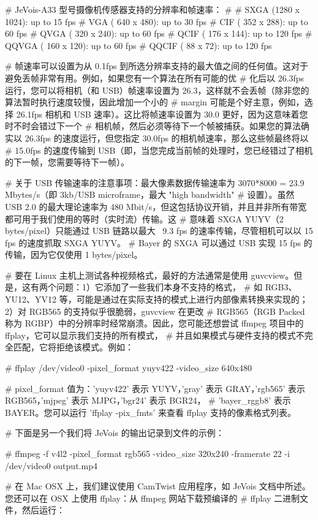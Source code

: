 \begin{DoxyVerb}
# JeVois-A33 型号摄像机传感器支持的分辨率和帧速率：
#
#  SXGA (1280 x 1024): up to 15 fps
#   VGA ( 640 x  480): up to 30 fps
#   CIF ( 352 x  288): up to 60 fps
#  QVGA ( 320 x  240): up to 60 fps
#  QCIF ( 176 x  144): up to 120 fps
# QQVGA ( 160 x  120): up to 60 fps
# QQCIF (  88 x   72): up to 120 fps

# 帧速率可以设置为从 0.1fps 到所选分辨率支持的最大值之间的任何值。这对于避免丢帧非常有用。例如，如果您有一个算法在所有可能的优
# 化后以 26.3fps 运行，您可以将相机（和 USB）帧速率设置为 26.3，这样就不会丢帧（除非您的算法暂时执行速度较慢，因此增加一个小的
# margin 可能是个好主意，例如，选择 26.1fps 相机和 USB 速率）。这比将帧速率设置为 30.0 更好，因为这意味着您时不时会错过下一个
# 相机帧，然后必须等待下一个帧被捕获。如果您的算法确实以 26.3fps 的速度运行，但您指定 30.0fps 的相机帧速率，那么这些帧最终将以 
# 15.0fps 的速度传输到 USB（即，当您完成当前帧的处理时，您已经错过了相机的下一帧，您需要等待下一帧）。

# 关于 USB 传输速率的注意事项：最大像素数据传输速率为 3070*8000 = 23.9 Mbytes/s（即 3kb/USB microframe，最大 "high bandwidth" 
# 设置）。虽然 USB 2.0 的最大理论速率为 480 Mbit/s，但这包括协议开销，并且并非所有带宽都可用于我们使用的等时（实时流）传输。这
# 意味着 SXGA YUYV（2 bytes/pixel）只能通过 USB 链路以最大 ~9.3 fps 的速率传输，尽管相机可以以 15 fps 的速度抓取 SXGA YUYV。
# Bayer 的 SXGA 可以通过 USB 实现 15 fps 的传输，因为它仅使用 1 bytes/pixel。

# 要在 Linux 主机上测试各种视频格式，最好的方法通常是使用 guvcview。但是，这有两个问题：1）它添加了一些我们本身不支持的格式，
# 如 RGB3、YU12、YV12 等，可能是通过在实际支持的模式上进行内部像素转换来实现的；2）对 RGB565 的支持似乎很脆弱，guvcview 在更改 
# RGB565（RGB Packed 称为 RGBP）中的分辨率时经常崩溃。因此，您可能还想尝试 ffmpeg 项目中的 ffplay，它可以显示我们支持的所有模式，
# 并且如果模式与硬件支持的模式不完全匹配，它将拒绝该模式。例如：

#   ffplay /dev/video0 -pixel_format yuyv422 -video_size 640x480 

# pixel_format 值为：'yuyv422' 表示 YUYV，'gray' 表示 GRAY，'rgb565' 表示 RGB565，'mjpeg' 表示 MJPG，'bgr24' 表示 BGR24，
# 'bayer_rggb8' 表示 BAYER。您可以运行 'ffplay -pix_fmts' 来查看 ffplay 支持的像素格式列表。

# 下面是另一个我们将 JeVois 的输出记录到文件的示例：

#   ffmpeg -f v4l2 -pixel_format rgb565 -video_size 320x240 -framerate 22 -i /dev/video0 output.mp4 

# 在 Mac OSX 上，我们建议使用 CamTwist 应用程序，如 JeVois 文档中所述。您还可以在 OSX 上使用 ffplay：从 ffmpeg 网站下载预编译的 
# ffplay 二进制文件，然后运行：


\end{DoxyVerb}

